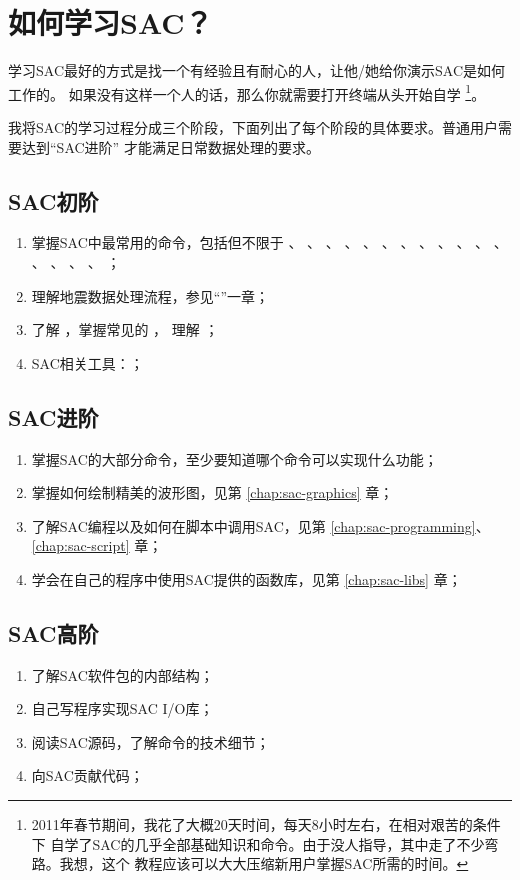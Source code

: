 \section{如何学习SAC？}
学习SAC最好的方式是找一个有经验且有耐心的人，让他/她给你演示SAC是如何工作的。
如果没有这样一个人的话，那么你就需要打开终端从头开始自学
\footnote{2011年春节期间，我花了大概20天时间，每天8小时左右，在相对艰苦的条件下
    自学了SAC的几乎全部基础知识和命令。由于没人指导，其中走了不少弯路。我想，这个
    教程应该可以大大压缩新用户掌握SAC所需的时间。}。

我将SAC的学习过程分成三个阶段，下面列出了每个阶段的具体要求。普通用户需要达到``SAC进阶''
才能满足日常数据处理的要求。

\subsection*{SAC初阶}
\begin{enumerate}
    \item 掌握SAC中最常用的命令，包括但不限于
            、
            、
            、
            、
            、
            、
            、
            、
            、
            、
            、
            、
            、
            、
            、
            、
            ；
        \item 理解地震数据处理流程，参见``''一章；
        \item 了解 ，掌握常见的 ，
            理解 ；
        \item SAC相关工具：；
\end{enumerate}

\subsection*{SAC进阶}
\begin{enumerate}
\item 掌握SAC的大部分命令，至少要知道哪个命令可以实现什么功能；
\item 掌握如何绘制精美的波形图，见第 \ref{chap:sac-graphics} 章；
\item 了解SAC编程以及如何在脚本中调用SAC，见第 \ref{chap:sac-programming}、\ref{chap:sac-script} 章；
\item 学会在自己的程序中使用SAC提供的函数库，见第 \ref{chap:sac-libs} 章；
\end{enumerate}

\subsection*{SAC高阶}
\begin{enumerate}
\item 了解SAC软件包的内部结构；
\item 自己写程序实现SAC I/O库；
\item 阅读SAC源码，了解命令的技术细节；
\item 向SAC贡献代码；
\end{enumerate}
